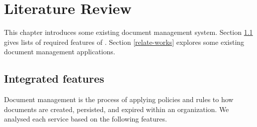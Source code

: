 \chapter{Literature Review}
This chapter introduces some existing document management system.
Section \ref{dms-features} gives lists of required features of \dms.
Section \ref{relate-works} explores some existing document management applications.

\section{Integrated features} \label{dms-features}
Document management is the process of applying policies and rules to how documents are created, persisted, and expired within an organization.
We analysed each service based on the following features.

